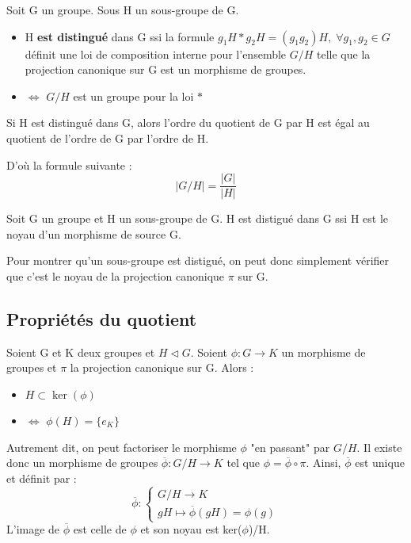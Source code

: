 \begin{theorem}
	Soit G un groupe. Sous H un sous-groupe de G. 
	\begin{itemize}
		\item[] H \textbf{est distingué} dans G ssi la formule $g_1H \ast g_2H = (g_1g_2)H, \; \forall g_1,g_2 \in G$ 
		définit une loi de composition interne pour l'ensemble $G/H$ telle que la projection canonique sur G est un morphisme de groupes. 
		\item[]$\iff$  $G/H$ est un groupe pour la loi $\ast$  
	\end{itemize}
\end{theorem}

\newpage 

\begin{corollary}
	Si H est distingué dans G, alors l'ordre du quotient de G par H est égal au quotient de l'ordre de G par l'ordre de H. 

	D'où la formule suivante :
		\[ |G/H| = \frac{|G|}{|H|} \]
\end{corollary}

\begin{corollary}
	Soit G un groupe et H un sous-groupe de G. H est distigué dans G ssi H est le noyau d'un morphisme de source G. 
\end{corollary}

\begin{remark}
	Pour montrer qu'un sous-groupe est distigué, on peut donc simplement vérifier que c'est le noyau de la projection canonique $\pi$ sur G. 
\end{remark}

\subsection{Propriétés du quotient}

\begin{theorem}
	Soient G et K deux groupes et $H \triangleleft G$. Soient $\phi : G \longrightarrow K$ un morphisme de groupes 
	et $\pi$ la projection canonique sur G. Alors :
	\begin{itemize}
		\item[] $H \subset \ker(\phi)$ 
		\item[]$\iff$  $\phi (H) = \{e_K\}$ 
	\end{itemize}
	Autrement dit, on peut factoriser le morphisme $\phi$ "en passant" par $G/H$. 
	Il existe donc un morphisme de groupes $\overline{\phi} : G/H \longrightarrow K$ tel que $\phi = \overline{\phi} \circ \pi$. 
	Ainsi, $\overline{\phi}$ est unique et définit par : 
		\[\overline{\phi} : 
			\begin{cases}
				G/H \longrightarrow K \\ 
				gH \longmapsto \overline{\phi}(gH) = \phi(g)
			\end{cases}
		\]
	L'image de $\overline{\phi}$ est celle de $\phi$ et son noyau est ker($\phi$)/H.
\end{theorem}

